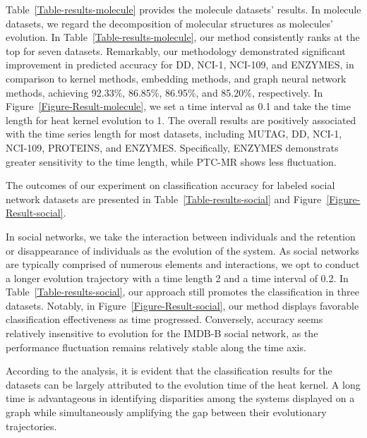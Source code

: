 \documentclass[10pt,journal,compsoc]{IEEEtran}
\begin{document}
Table~\ref{Table-results-molecule} provides the molecule datasets' results. In molecule datasets, we regard the decomposition of molecular structures as molecules' evolution. In Table~\ref{Table-results-molecule}, our method consistently ranks at the top for seven datasets. Remarkably, our methodology demonstrated significant improvement in predicted accuracy for DD, NCI-1, NCI-109, and ENZYMES, in comparison to kernel methods, embedding methods, and graph neural network methods, achieving 92.33\%, 86.85\%, 86.95\%, and 85.20\%, respectively. In Figure~\ref{Figure-Result-molecule}, we set a time interval as 0.1 and take the time length for heat kernel evolution to 1. The overall results are positively associated with the time series length for most datasets, including MUTAG, DD, NCI-1, NCI-109, PROTEINS, and ENZYMES. Specifically, ENZYMES demonstrats greater sensitivity to the time length, while PTC-MR shows less fluctuation.


The outcomes of our experiment on classification accuracy for labeled social network datasets are presented in Table~\ref{Table-results-social} and Figure~\ref{Figure-Result-social}.


In social networks, we take the interaction between individuals and the retention or disappearance of individuals as the evolution of the system. As social networks are typically comprised of numerous elements and interactions, we opt to conduct a longer evolution trajectory with a time length 2 and a time interval of 0.2. In Table~\ref{Table-results-social}, our approach still promotes the classification in three datasets. Notably, in Figure~\ref{Figure-Result-social}, our method displays favorable classification effectiveness as time progressed. Conversely, accuracy seems relatively insensitive to evolution for the IMDB-B social network, as the performance fluctuation remains relatively stable along the time axis.


According to the analysis, it is evident that the classification results for the datasets can be largely attributed to the evolution time of the heat kernel. A long time is advantageous in identifying disparities among the systems displayed on a graph while simultaneously amplifying the gap between their evolutionary trajectories.
\end{document}
